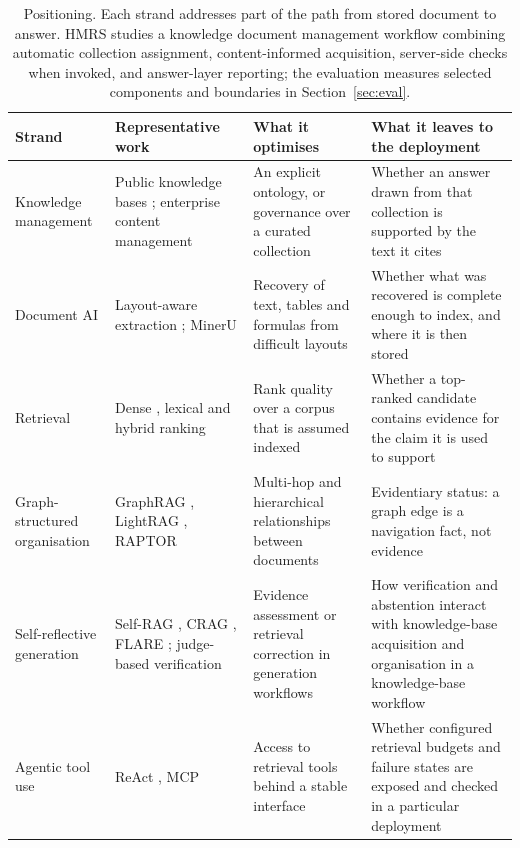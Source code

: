 \begin{table}[t]
\centering
\small
\setlength{\tabcolsep}{4pt}
\renewcommand{\arraystretch}{1.18}
\caption{Positioning. Each strand addresses part of the path from stored
document to answer. HMRS studies a knowledge document management workflow
combining automatic collection assignment, content-informed acquisition,
server-side checks when invoked, and answer-layer reporting; the evaluation
measures selected components and boundaries in
Section~\ref{sec:eval}.}
\label{tab:positioning}
\begin{tabular}{@{}>{\raggedright\arraybackslash}p{}>{\raggedright\arraybackslash}p{}>{\raggedright\arraybackslash}p{}>{\raggedright\arraybackslash}p{}@{}}
\toprule
Strand & Representative work & What it optimises & What it leaves to the deployment\\
\midrule
Knowledge management & Public knowledge bases \citep{auer-dbpedia-kb-2007,hoffart-yago2-kb-2013}; enterprise content management \citep{paivarinta-ecm-2005,tyrvaainen-ecm-2006} & An explicit ontology, or governance over a curated collection & Whether an answer drawn from that collection is supported by the text it cites\\
Document AI & Layout-aware extraction \citep{zhong-publaynet-layout-2019,huang-layoutlmv3-docai-2022}; MinerU \citep{mineru} & Recovery of text, tables and formulas from difficult layouts & Whether what was recovered is complete enough to index, and where it is then stored\\
Retrieval & Dense \citep{dpr}, lexical \citep{bm25} and hybrid ranking \citep{rrf-cormack,bge-m3} & Rank quality over a corpus that is assumed indexed & Whether a top-ranked candidate contains evidence for the claim it is used to support\\
Graph-structured organisation & GraphRAG \citep{graphrag}, LightRAG \citep{lightrag}, RAPTOR \citep{raptor} & Multi-hop and hierarchical relationships between documents & Evidentiary status: a graph edge is a navigation fact, not evidence\\
Self-reflective generation & Self-RAG \citep{selfrag}, CRAG \citep{crag}, FLARE \citep{flare}; judge-based verification \citep{zheng-llmjudge,lightman-verify} & Evidence assessment or retrieval correction in generation workflows & How verification and abstention interact with knowledge-base acquisition and organisation in a knowledge-base workflow\\
Agentic tool use & ReAct \citep{react-yao}, MCP \citep{mcp} & Access to retrieval tools behind a stable interface & Whether configured retrieval budgets and failure states are exposed and checked in a particular deployment\\

\end{tabular}
\end{table}
